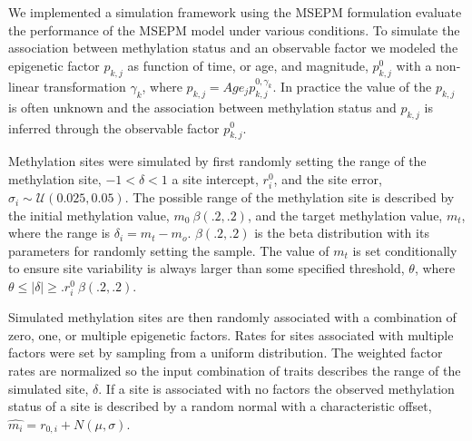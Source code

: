 \documentclass[sn-nature]{sn-jnl}
\begin{document}
{\begin{linenumbers}
We implemented a simulation framework using the MSEPM formulation evaluate the performance of the MSEPM model under various conditions.
To simulate the association between methylation status and an observable factor we modeled the 
epigenetic factor $p_{k,j}$ as function of time, or age, and magnitude, $p_{k,j}^0$ with a non-linear transformation $\gamma_{k}$, 
where $p_{k,j} = Age_j p_{k,j}^{0,\gamma_{k}}$. In practice the value of the $p_{k,j}$ is often unknown and the association between 
methylation status and $p_{k,j}$ is inferred through the observable factor $p_{k,j}^0$. 

Methylation sites were simulated by first randomly setting the range of the methylation site, 
$-1< \delta < 1$ a site intercept, $r^0_i$, and the site error, $\sigma_i \sim \mathcal{U}(0.025, 0.05)$. The possible 
range of the methylation site is described by the initial methylation value, $m_0 ~ \beta(.2,.2)$, 
and the target methylation value, $m_t$, where the range is $\delta_i = m_t - m_o$. $\beta(.2,.2)$ is the beta distribution with its parameters for randomly setting the sample.
The value of $m_t$ is set conditionally to ensure site variability is always larger than some specified threshold, $\theta$, where 
$ \theta \leq|\delta| \geq. r^0_i ~ \beta(.2,.2)$.


Simulated methylation sites are then randomly associated with a combination of zero, one, or multiple epigenetic factors. Rates for sites 
associated with multiple factors were set by sampling from a uniform distribution. The weighted factor rates are normalized so 
the input combination of traits describes the range of the simulated site, $\delta$. If a site is associated 
with no factors the observed methylation status of a site is described by a random normal with a characteristic offset, $\hat{m_i} = r_{0,i} + N(\mu, \sigma)$.
 



\end{linenumbers}}
\end{document}
